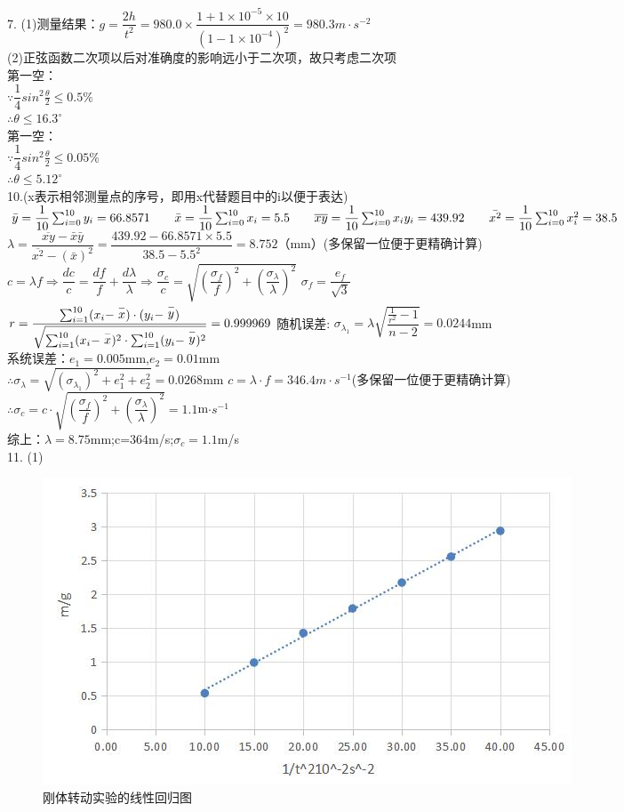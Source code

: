 \documentclass{article}
\begin{document}
7.
(1)测量结果：$g=\dfrac{2h}{t^2}=980.0\times\dfrac{1+1\times10^{-5}\times10}{(1-1\times10^{-4})^2}=980.3m\cdot s^{-2}$\\
(2)正弦函数二次项以后对准确度的影响远小于二次项，故只考虑二次项\\
第一空：\\
$\because \dfrac{1}{4}sin^2\frac{\theta}{2}\leq0.5\%$\\
$\therefore \theta \leq 16.3^\circ$\\
第一空：\\
$\because \dfrac{1}{4}sin^2\frac{\theta}{2}\leq0.05\%$\\
$\therefore \theta \leq 5.12^\circ$\\

10.(x表示相邻测量点的序号，即用x代替题目中的i以便于表达)\\
$\bar{y}=\dfrac{1}{10} \sum_{i=0}^{10} y_i=66.8571\qquad \bar{x}=\dfrac{1}{10} \sum_{i=0}^{10} x_i=5.5\\ \qquad
\overline{xy}=\dfrac{1}{10} \sum_{i=0}^{10} x_iy_i=439.92 \qquad \bar{x^2}=\dfrac{1}{10} \sum_{i=0}^{10} x_i^2=38.5$\\
$\lambda = \dfrac{\overline{xy}-\bar{x}\bar{y}}{\overline{x^2}-(\bar{x})^2}=\dfrac{439.92-66.8571\times5.5}{38.5-5.5^2}=8.752$（mm）(多保留一位便于更精确计算)\\
$ c= \lambda f \Rightarrow \dfrac{dc}{c}=\dfrac{df}{f}+\dfrac{d\lambda}{\lambda} \Rightarrow
 \dfrac{\sigma_c}{c}=\sqrt{(\dfrac{\sigma_f}{f})^2+(\dfrac{\sigma_\lambda}{\lambda})^2}$\qquad
$\sigma_f=\dfrac{e_f}{\sqrt{3}}$\\
$ r = \dfrac{\sum _{i=1}^{10}(x_{i} - \stackrel{-}{x})\cdot(y_{i} - \stackrel{-}{y})}{\sqrt{\sum _{i=1}^{10}(x_{i} - \stackrel{-}{x})^{2} \cdot \sum _{i=1}^{10}(y_{i} - \stackrel{-}{y})^{2}}} = 0.999969 \\$
随机误差: $\sigma_{\lambda_1} =  \lambda \sqrt{\dfrac{\frac{1}{r^{2}}-1}{n-2}}=0.0244$mm\\
系统误差：$e_1=0.005$mm,\quad$e_2=0.01$mm\\
$\therefore \sigma_\lambda = \sqrt{(\sigma_{\lambda_1})^2+e_1^2+e_2^2}=0.0268$mm \quad$c=\lambda\cdot f = 346.4m\cdot s^{-1}$(多保留一位便于更精确计算)\\
$\therefore \sigma_c = c \cdot\sqrt{(\dfrac{\sigma_f}{f})^2+(\dfrac{\sigma_\lambda}{\lambda})^2} =1.1 $m$\cdot s^{-1} $\\
综上：$\lambda=8.75$mm;\quad c=$364$m/s;\quad$\sigma_c=1.1$m/s\\
11.
(1)\begin{figure}[htbp]
	\centering
	\includegraphics[width=.6\linewidth]{11.jpg}
	\caption{刚体转动实验的线性回归图}
\end{figure}\noindent%
\end{document}
